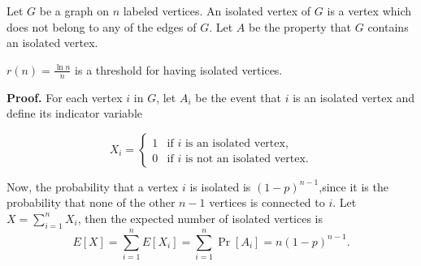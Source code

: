 Let $G$ be a graph on $n$ labeled vertices. An isolated vertex of $G$ is a vertex which does not belong to any of the edges of $G$. Let $A$ be the property that $G$ contains an isolated vertex.

\begin{theorem}\label{thm:probmet:isolatedverticesthreshold}
    $\displaystyle{r(n) = \frac{\ln n}{n}}$ is a threshold for having isolated vertices. 
\end{theorem}

\textbf{Proof. } For each vertex $i$ in $G$, let $A_i$ be the event that $i$ is an isolated vertex and define its indicator variable 

\[X_i = 
\left\{
	\begin{array}{ll}
		1  & \mbox{if } i \text{ is an isolated vertex,} \\
		0 & \mbox{if } i \text{ is not an isolated vertex.}
	\end{array}
\right.
\]

Now, the probability that a vertex $i$ is isolated is $(1 - p)^{n - 1}$,since it is the probability that none of the other $n - 1$ vertices is connected to $i$. Let $X = \sum_{i = 1}^n X_i$, then the expected number of isolated vertices is
 \[E[X] = \sum_{i = 1}^{n} E[X_i] = \sum_{i = 1}^{n} \Pr[A_i] = n(1 - p)^{n - 1}.\]



